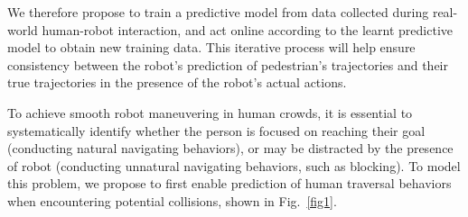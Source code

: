 \documentclass[conference]{IEEEtran}
\begin{document}
We therefore propose to train a predictive model from 
data collected during real-world human-robot interaction, and 
act online according to the learnt predictive model to obtain new training data. 
This iterative process will help ensure consistency between the robot's 
prediction of pedestrian's trajectories and their true trajectories in the 
presence of the robot's actual actions.


To achieve smooth robot maneuvering in human crowds, it is essential to 
systematically identify whether the person is focused on 
reaching their goal (conducting natural navigating behaviors), or may be 
distracted by the presence of robot (conducting unnatural navigating 
behaviors, such as blocking). To model this problem, we propose to first 
enable prediction of human traversal behaviors when encountering potential 
collisions, shown in Fig.~\ref{fig1}. 
\end{document}
